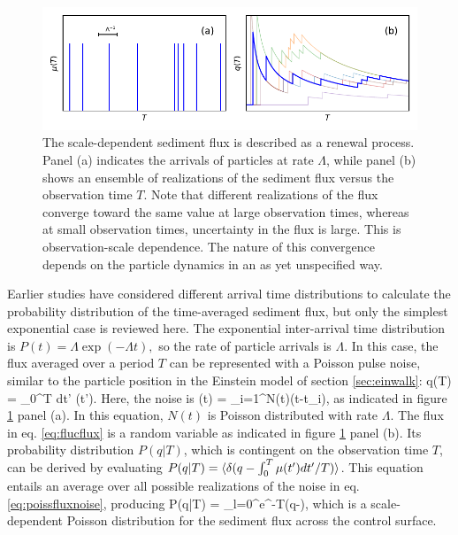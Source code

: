  \begin{figure}[!htbp]
	\includegraphics[width=\linewidth,keepaspectratio]{./figures/ch1/anceyRenewal.pdf}
	\caption{The scale-dependent sediment flux is described as a renewal process. Panel (a) indicates the arrivals of particles at rate $\Lambda$, while panel (b) shows an ensemble of realizations of the sediment flux versus the observation time $T$. Note that different realizations of the flux converge toward the same value at large observation times, whereas at small observation times, uncertainty in the flux is large. This is observation-scale dependence. The nature of this convergence depends on the particle dynamics in an as yet unspecified way. }
	\label{fig:ancey}
\end{figure}
Earlier studies have considered different arrival time distributions to calculate the probability distribution of the time-averaged sediment flux, but only the simplest exponential case is reviewed here. The exponential inter-arrival time distribution is $P(t) = \Lambda \exp(-\Lambda t),$ so the rate of particle arrivals is $\Lambda$.
In this case, the flux averaged over a period $T$ can be represented with a Poisson pulse noise, similar to the particle position in the Einstein model of section \ref{sec:einwalk}:
\be q(T) = \int_0^T dt' \mu(t'). \label{eq:flucflux}\ee
Here, the noise is 
\be \mu(t) = \sum_{i=1}^{N(t)}\delta(t-t_i), \label{eq:poissfluxnoise}\ee
as indicated in figure \ref{fig:ancey} panel (a). In this equation, $N(t)$ is Poisson distributed with rate $\Lambda$. 
The flux in eq. \ref{eq:flucflux} is a random variable as indicated in figure \ref{fig:ancey} panel (b). Its probability distribution $P(q|T)$, which is contingent on the observation time $T$, can be derived by evaluating $P(q|T) = \langle \delta(q-\int_0^T \mu(t') dt'/T) \rangle$.
This equation entails an average over all possible realizations of the noise in eq. \ref{eq:poissfluxnoise}, producing \citep{VanKampen2007}
\be P(q|T) = \sum_{l=0}^\infty {}e^{-\Lambda T}\delta(q-),\ee
which is a scale-dependent Poisson distribution for the sediment flux across the control surface.

